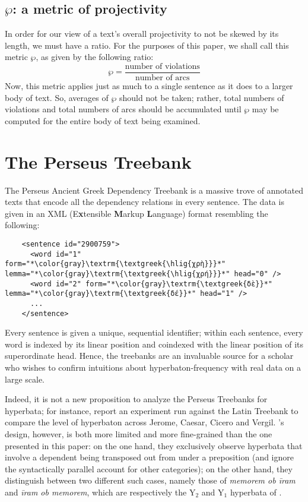 \documentclass[letterpaper, 11pt]{article}
\newcommand{\FN}{\mathsf}
\newcommand{\hlig}[1]{{\addfontfeature{Ligatures=Historical}{#1}}}
\begin{document}
\subsection{\ensuremath{\FN{\wp}}: a metric of projectivity}

In order for our view of a text's overall projectivity to not be skewed by its
length, we must have a ratio. For the purposes of this paper, we shall call this
metric \ensuremath{\FN{\wp}}, as given by the following ratio:
%
\[ \wp = \frac{\text{number of violations}}{\text{number of arcs}} \]
%
Now, this metric applies just as much to a single sentence as it does to a
larger body of text. So, averages of \ensuremath{\FN{\wp}} should not be taken; rather, total
numbers of violations and total numbers of arcs should be accumulated until
\ensuremath{\FN{\wp}} may be computed for the entire body of text being examined.

\section{The Perseus Treebank}
%
The Perseus Ancient Greek Dependency Treebank is a massive trove of annotated
texts that encode all the dependency relations in every sentence. The data is
given in an XML (E\textbf{x}tensible \textbf{M}arkup \textbf{L}anguage) format
resembling the following:

\lstset{
  language=XML,
  escapeinside=**
}

\begin{lstlisting}
    <sentence id="2900759">
      <word id="1" form="*\color{gray}\textrm{\textgreek{\hlig{χρὴ}}}*" lemma="*\color{gray}\textrm{\textgreek{\hlig{χρή}}}*" head="0" />
      <word id="2" form="*\color{gray}\textrm{\textgreek{δὲ}}*" lemma="*\color{gray}\textrm{\textgreek{δέ}}*" head="1" />
      ...
    </sentence>
\end{lstlisting}

\noindent
%
Every sentence is given a unique, sequential identifier; within each sentence,
every word is indexed by its linear position and coindexed with the linear
position of its superordinate head. Hence, the treebanks are an invaluable
source for a scholar who wishes to confirm intuitions about hyperbaton-frequency
with real data on a large scale.

Indeed, it is not a new proposition to analyze the Perseus Treebanks for
hyperbata; for instance, \citet{bamman2006design} report an experiment run
against the Latin Treebank to compare the level of hyperbaton across Jerome,
Caesar, Cicero and Vergil. \citeauthor{bamman2006design}'s design, however, is
both more limited and more fine-grained than the one presented in this paper: on
the one hand, they exclusively observe hyperbata that involve a dependent being
transposed out from under a preposition (and ignore the syntactically parallel
account for other categories); on the other hand, they distinguish between two
different such cases, namely those of \emph{memorem ob īram} and \emph{īram ob
memorem}, which are respectively the Y$_2$ and Y$_1$ hyperbata of
\citeauthor{devine2000discontinuous}.
\end{document}
